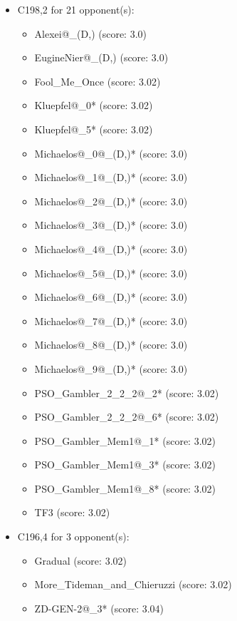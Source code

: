 \begin{appendices}
\begin{itemize}
    \item C198,2 for 21 opponent(s):
    \begin{multicols}{3}
         \begin{itemize}
            \item Alexei@\_(D,) (score: 3.0)
            \item EugineNier@\_(D,) (score: 3.0)
            \item Fool\_Me\_Once (score: 3.02)
            \item Kluepfel@\_0* (score: 3.02)
            \item Kluepfel@\_5* (score: 3.02)
            \item Michaelos@\_0@\_(D,)* (score: 3.0)
            \item Michaelos@\_1@\_(D,)* (score: 3.0)
            \item Michaelos@\_2@\_(D,)* (score: 3.0)
            \item Michaelos@\_3@\_(D,)* (score: 3.0)
            \item Michaelos@\_4@\_(D,)* (score: 3.0)
            \item Michaelos@\_5@\_(D,)* (score: 3.0)
            \item Michaelos@\_6@\_(D,)* (score: 3.0)
            \item Michaelos@\_7@\_(D,)* (score: 3.0)
            \item Michaelos@\_8@\_(D,)* (score: 3.0)
            \item Michaelos@\_9@\_(D,)* (score: 3.0)
            \item PSO\_Gambler\_2\_2\_2@\_2* (score: 3.02)
            \item PSO\_Gambler\_2\_2\_2@\_6* (score: 3.02)
            \item PSO\_Gambler\_Mem1@\_1* (score: 3.02)
            \item PSO\_Gambler\_Mem1@\_3* (score: 3.02)
            \item PSO\_Gambler\_Mem1@\_8* (score: 3.02)
            \item TF3 (score: 3.02)
        \end{itemize}
     \end{multicols}
     
    \item C196,4 for 3 opponent(s):
    \begin{multicols}{3}
         \begin{itemize}
            \item Gradual (score: 3.02)
            \item More\_Tideman\_and\_Chieruzzi (score: 3.02)
            \item ZD-GEN-2@\_3* (score: 3.04)
        \end{itemize}
     \end{multicols}
     

\end{itemize}
\end{appendices}
